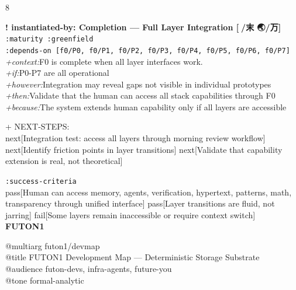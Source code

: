 \documentclass[landscape]{article}
\newcommand{\flexitag}[1]{\textcolor[gray]{0.35}{\textit{#1}}}
\newenvironment{devmapgreenfield}{%
  \def\FrameCommand{\colorbox{devmapgreenfieldbg}}%
  \setlength{\fboxsep}{2pt}%
  \MakeFramed{\advance\hsize-\width \FrameRestore}%
}{\endMakeFramed}
\newenvironment{devmapstub}{%
  \def\FrameCommand{\colorbox{devmapstubbg}}%
  \setlength{\fboxsep}{2pt}%
  \MakeFramed{\advance\hsize-\width \FrameRestore}%
}{\endMakeFramed}
\begin{document}
\begin{paracol}{8}
\begin{devmapstub}
\par
\par
\end{devmapstub}
\begin{devmapgreenfield}
\textbf{! instantiated-by: Completion — Full Layer Integration [🌽/末 🌏/万]}\\
  \texttt{:\allowbreak{}maturity :\allowbreak{}greenfield}\\
  \texttt{:\allowbreak{}depends-\allowbreak{}on [f0/\allowbreak{}P0,\allowbreak{} f0/\allowbreak{}P1,\allowbreak{} f0/\allowbreak{}P2,\allowbreak{} f0/\allowbreak{}P3,\allowbreak{} f0/\allowbreak{}P4,\allowbreak{} f0/\allowbreak{}P5,\allowbreak{} f0/\allowbreak{}P6,\allowbreak{} f0/\allowbreak{}P7]}\\
  \flexitag{+context:}F0 is complete when all layer interfaces work.\\
  \flexitag{+if:}P0-P7 are all operational\\
  \flexitag{+however:}Integration may reveal gaps not visible in individual prototypes\\
  \flexitag{+then:}Validate that the human can access all stack capabilities through F0\\
  \flexitag{+because:}The system extends human capability only if all layers are accessible\\
\par
  + NEXT-STEPS:\\
    next[Integration test: access all layers through morning review workflow] next[Identify friction points in layer transitions] next[Validate that capability extension is real, not theoretical]\\
\par
  \texttt{:\allowbreak{}success-\allowbreak{}criteria}\\
    pass[Human can access memory, agents, verification, hypertext, patterns, math, transparency through unified interface] pass[Layer transitions are fluid, not jarring] fail[Some layers remain inaccessible or require context switch]\\
\end{devmapgreenfield}
\switchcolumn
\textbf{FUTON1}\par
\medskip
@multiarg futon1/devmap\\
@title FUTON1 Development Map — Deterministic Storage Substrate\\
@audience futon-devs, infra-agents, future-you\\
@tone formal-analytic\\

\end{paracol}
\end{document}
